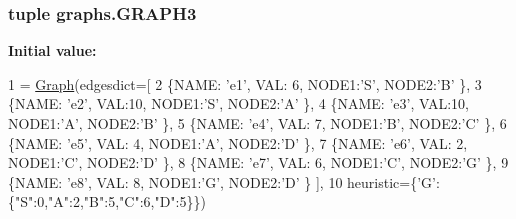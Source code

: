 \subsubsection[{G\+R\+A\+P\+H3}]{\setlength{\rightskip}{0pt plus 5cm}tuple graphs.\+G\+R\+A\+P\+H3}\label{namespacegraphs_ae1928e75cd53a1fe3a92fe7b5519ba68}
{\bfseries Initial value\+:}
\begin{DoxyCode}
1 = \hyperlink{classsearch_1_1_graph}{Graph}(edgesdict=[ 
2         \{NAME: \textcolor{stringliteral}{'e1'}, VAL: 6, NODE1:\textcolor{stringliteral}{'S'}, NODE2:\textcolor{stringliteral}{'B'} \},
3         \{NAME: \textcolor{stringliteral}{'e2'}, VAL:10, NODE1:\textcolor{stringliteral}{'S'}, NODE2:\textcolor{stringliteral}{'A'} \},
4         \{NAME: \textcolor{stringliteral}{'e3'}, VAL:10, NODE1:\textcolor{stringliteral}{'A'}, NODE2:\textcolor{stringliteral}{'B'} \},
5         \{NAME: \textcolor{stringliteral}{'e4'}, VAL: 7, NODE1:\textcolor{stringliteral}{'B'}, NODE2:\textcolor{stringliteral}{'C'} \},
6         \{NAME: \textcolor{stringliteral}{'e5'}, VAL: 4, NODE1:\textcolor{stringliteral}{'A'}, NODE2:\textcolor{stringliteral}{'D'} \},
7         \{NAME: \textcolor{stringliteral}{'e6'}, VAL: 2, NODE1:\textcolor{stringliteral}{'C'}, NODE2:\textcolor{stringliteral}{'D'} \},
8         \{NAME: \textcolor{stringliteral}{'e7'}, VAL: 6, NODE1:\textcolor{stringliteral}{'C'}, NODE2:\textcolor{stringliteral}{'G'} \},
9         \{NAME: \textcolor{stringliteral}{'e8'}, VAL: 8, NODE1:\textcolor{stringliteral}{'G'}, NODE2:\textcolor{stringliteral}{'D'} \} ],
10                heuristic=\{\textcolor{stringliteral}{'G'}:\{\textcolor{stringliteral}{"S"}:0,\textcolor{stringliteral}{"A"}:2,\textcolor{stringliteral}{"B"}:5,\textcolor{stringliteral}{"C"}:6,\textcolor{stringliteral}{"D"}:5\}\})
\end{DoxyCode}
\hypertarget{namespacegraphs_a71e8d3e8053782d78d30e3661cb731d6}{}
